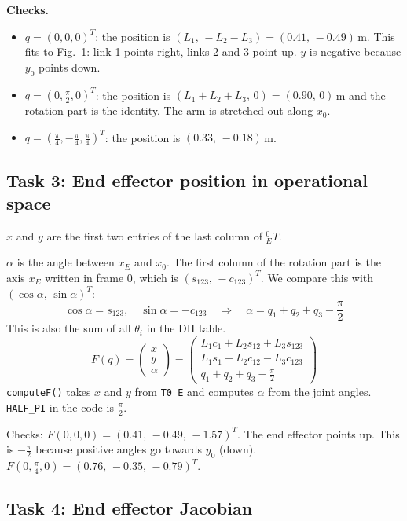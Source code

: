 \documentclass[11pt, a4paper]{article}
\begin{document}
\textbf{Checks.}
\begin{itemize}
  \item $q = (0, 0, 0)^T$: the position is $(L_1,\, -L_2 - L_3) = (0.41,\, -0.49)$\,m. This fits to
        Fig.~1: link 1 points right, links 2 and 3 point up. $y$ is negative because $y_0$ points down.
  \item $q = (0, \frac{\pi}{2}, 0)^T$: the position is $(L_1 + L_2 + L_3,\, 0) = (0.90,\, 0)$\,m and
        the rotation part is the identity. The arm is stretched out along $x_0$.
  \item $q = (\frac{\pi}{4}, -\frac{\pi}{4}, \frac{\pi}{4})^T$: the position is $(0.33,\, -0.18)$\,m.
\end{itemize}

\subsection*{Task 3: End effector position in operational space}

$x$ and $y$ are the first two entries of the last column of ${}^0_ET$.

$\alpha$ is the angle between $x_E$ and $x_0$. The first column of the rotation part is the axis $x_E$
written in frame 0, which is $(s_{123},\, -c_{123})^T$. We compare this with
$(\cos\alpha,\, \sin\alpha)^T$:
\[
  \cos\alpha = s_{123}, \quad \sin\alpha = -c_{123}
  \quad\Rightarrow\quad \alpha = q_1 + q_2 + q_3 - \frac{\pi}{2}
\]
This is also the sum of all $\theta_i$ in the DH table.
\[
  \boxed{
  F(q) = \begin{pmatrix} x \\ y \\ \alpha \end{pmatrix} =
  \begin{pmatrix}
    L_1 c_1 + L_2 s_{12} + L_3 s_{123} \\
    L_1 s_1 - L_2 c_{12} - L_3 c_{123} \\
    q_1 + q_2 + q_3 - \frac{\pi}{2}
  \end{pmatrix}}
\]
\texttt{computeF()} takes $x$ and $y$ from \texttt{T0\_E} and computes $\alpha$ from the joint angles.
\texttt{HALF\_PI} in the code is $\frac{\pi}{2}$.

Checks: $F(0, 0, 0) = (0.41,\, -0.49,\, -1.57)^T$. The end effector points up. This is
$-\frac{\pi}{2}$ because positive angles go towards $y_0$ (down).
$F(0, \frac{\pi}{4}, 0) = (0.76,\, -0.35,\, -0.79)^T$.

\subsection*{Task 4: End effector Jacobian}
\end{document}

